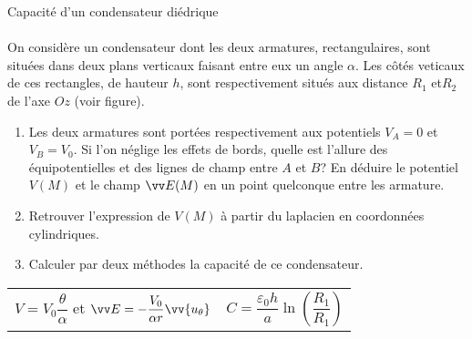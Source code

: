 \documentclass[french, a4paper, 11pt]{article}
\newcommand{\po}{\left(}         %
\newcommand{\pf}{\right)}        %
\newcommand{\pof}[1]{\po #1 \pf} %
\newcommand{\uth}{\vv{u_\theta}}    %
\begin{document}
\begin{cadre}{Capacité d'un condensateur diédrique}
  \begin{minipage}{0.65\linewidth}
  \paragraph*{}
  On considère un condensateur dont les deux armatures, rectangulaires, sont situées dans deux plans verticaux faisant entre eux un angle \(\alpha\). Les côtés veticaux de ces rectangles, de hauteur \(h\), sont respectivement situés aux distance \(R_{1}\) et\(R_{2}\) de l'axe \(Oz\) (voir figure).
  \end{minipage}
  \begin{minipage}{0.3\linewidth}
  \end{minipage}
  \begin{enumerate}[label=\upshape\alph*)]
    \item Les deux armatures sont portées respectivement aux potentiels \(V_{A}=0\) et \(V_{B} = V_{0}\). Si l'on néglige les effets de bords, quelle est l'allure des équipotentielles et des lignes de champ entre \(A\) et \(B\)? En déduire le potentiel \(V(M)\) et le champ \(\vv E(M)\) en un point quelconque entre les armature.
    \item Retrouver l'expression de \(V(M)\) à partir du laplacien en coordonnées cylindriques.
    \item Calculer par deux méthodes la capacité de ce condensateur.
  \end{enumerate}
  \tcblower
  \begin{tabularx}{\linewidth}{Xr}
    \(V=V_{0}\dfrac{\theta}{\alpha}\) et \(\vv E = -\dfrac{V_{0}}{\alpha r}\uth\) &
    \(C = \dfrac{\varepsilon_{0}h}{a}\ln\pof{\dfrac{R_{1}}{R_{1}}}\)
  \end{tabularx}
\end{cadre}
\end{document}
